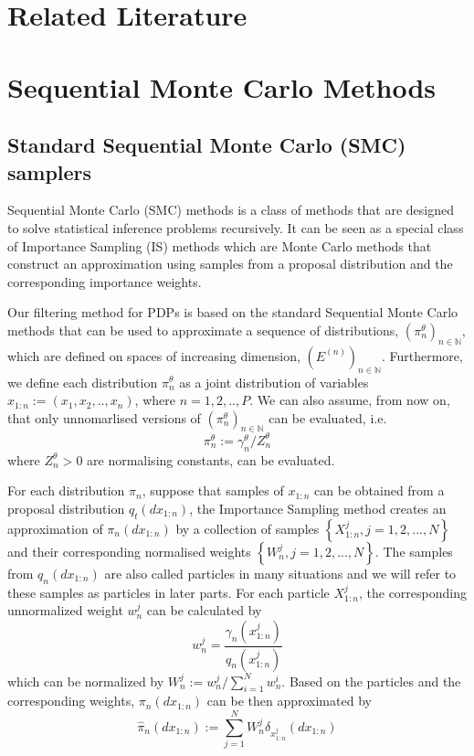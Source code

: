 \documentclass[12pt,a4paper]{article}
\begin{document}
\section{Related Literature}

\section{Sequential Monte Carlo Methods}
\subsection{Standard Sequential Monte Carlo (SMC) samplers}
Sequential Monte Carlo (SMC) methods is a class of methods that are designed to solve statistical inference problems recursively. It can be seen as a special class of Importance Sampling (IS) methods which are Monte Carlo methods that construct an approximation using samples from a proposal distribution and the corresponding importance weights. 

Our filtering method for PDPs is based on the standard Sequential Monte Carlo methods that can be used to approximate a sequence of distributions, $(\pi_n^{\theta})_{n \in \mathbb{N}}$, which are defined on spaces of increasing dimension, $\left(E^{(n)}\right)_{n \in \mathbb{N}}$. Furthermore, we define each distribution $\pi_n^{\theta}$ as a joint distribution of variables $x_{1:n}:= (x_1,x_2,..,x_n)$, where $n = 1,2,..,P$.
We can also assume, from now on, that only unnomarlised versions of $(\pi_n^{\theta})_{n \in \mathbb{N}}$ can be evaluated, i.e.
$$\pi_n^{\theta} := \gamma_n^{\theta}/Z_n^{\theta}$$
where $Z_n^{\theta} >0$ are normalising constants, can be evaluated.

For each distribution $\pi_n$, suppose that samples of $x_{1:n}$ can be obtained from a proposal distribution $q_t(dx_{1:n})$, the Importance Sampling method creates an approximation of $\pi_n(dx_{1:n})$ by a collection of samples $\left\{X_{1:n}^j, j=1,2,...,N\right\}$ and their corresponding normalised weights $\left\{W_n^j, j= 1,2,...,N\right\}$. The samples from $q_n(dx_{1:n})$ are also called particles in many situations and we will refer to these samples as particles in later parts. For each particle $X_{1:n}^j$, the corresponding unnormalized weight $w_n^j$ can be calculated by \begin{equation}
    \label{Standard SMC -  IS unnormalized weight}
    w_n^j = \frac{\gamma_n\left(x_{1:n}^j\right)}{q_n\left(x_{1:n}^j\right)}
\end{equation}
which can be normalized by $W_n^j := w_n^j/\sum_{i=1}^{N}w_n^i$. Based on the particles and the corresponding weights, $\pi_n(dx_{1:n})$ can be then approximated by 
\begin{equation}
    \label{Standard SMC - IS target approx}
    \hat{\pi}_n(dx_{1:n}) := \sum_{j=1}^{N} W_n^j \delta_{x_{1:n}^j}(dx_{1:n})
\end{equation}
\end{document}
